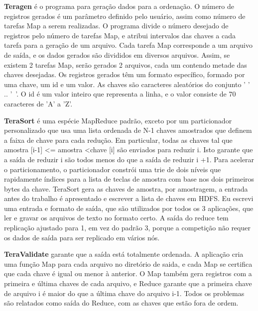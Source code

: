 \textbf{Teragen} é o programa para geração dados para a ordenação.
O número de registros gerados é um parâmetro definido pelo usuário, assim como número de tarefas Map a serem realizadas. O programa divide o número desejado de registros pelo número de tarefas Map, e atribui intervalos das chaves a cada tarefa para a geração de um arquivo. Cada tarefa Map corresponde a um arquivo de saída,  e os dados gerados são divididos em diversos arquivos. Assim, se existem 2 tarefas Map, serão gerados 2 arquivos, cada um contendo metade das chaves desejadas. 
Os registros gerados têm um formato específico, formado por uma chave, um id e um valor. As  chaves são caracteres aleatórios do conjunto ' ' .. '~'. O id é um valor inteiro que representa a linha, e o valor consiste de 70 caracteres de 'A' a 'Z'. 

\textbf{TeraSort} é uma espécie MapReduce padrão, exceto por um particionador personalizado que usa uma lista ordenada de N-1 chaves amostrados que definem a faixa de chave para cada redução. Em particular, todas as chaves tal que amostra [i-1] <= amostra <chave [i] são enviados para reduzir i. Isto garante que a saída de reduzir i são todos menos do que a saída de reduzir i +1. Para acelerar o particionamento, o particionador constrói uma trie de dois níveis que rapidamente índices para a lista de teclas de amostra com base nos dois primeiros bytes da chave. TeraSort gera as chaves de amostra, por amostragem, a entrada antes do trabalho é apresentado e escrever a lista de chaves em HDFS. Eu escrevi uma entrada e formato de saída, que são utilizados por todos os 3 aplicações, que ler e gravar os arquivos de texto no formato certo. A saída do reduce tem replicação ajustado para 1, em vez do padrão 3, porque a competição não requer os dados de saída para ser replicado em vários nós.
%

\textbf{TeraValidate} garante que a saída está totalmente ordenada. A aplicação cria uma função Map para cada arquivo no diretório de saida, e cada Map se certifica que cada chave é igual ou menor à anterior. O Map também gera registros com a primeira e última chaves de cada arquivo, e Reduce garante que a primeira chave de arquivo i é maior do que a última chave do arquivo i-1. Todos os problemas são relatados como saída do Reduce, com as chaves que estão fora de ordem.

